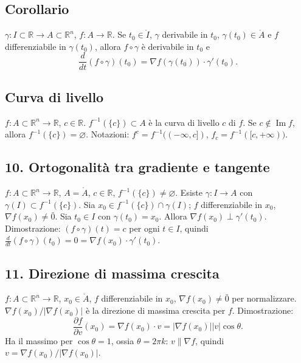 \documentclass[11pt,a4paper]{article}
\newcommand{\R}{\mathbb R}\newcommand{\N}{\mathbb N}\newcommand{\pagina}[1]{\clearpage}
\begin{document}
\subsection*{Corollario}
$\gamma:I\subset\R\to A\subset\R^n$, $f:A\to\R$. Se $t_0\in\mathring I$, $\gamma$ derivabile in $t_0$, $\gamma(t_0)\in\mathring A$ e $f$ differenziabile in $\gamma(t_0)$, allora $f\circ\gamma$ è derivabile in $t_0$ e
\[\frac{d}{dt}(f\circ\gamma)(t_0)=\nabla f(\gamma(t_0))\cdot\gamma'(t_0).\]
\pagina{25}
\subsection*{Curva di livello}
$f:A\subset\R^n\to\R$, $c\in\R$. $f^{-1}(\{c\})\subset A$ è la curva di livello $c$ di $f$. Se $c\notin\operatorname{Im}f$, allora $f^{-1}(\{c\})=\varnothing$.
Notazioni: $f^c=f^{-1}(({-\infty},c])$, $f_c=f^{-1}([c,+\infty))$.
\subsection*{10. Ortogonalità tra gradiente e tangente}
$f:A\subset\R^n\to\R$, $A=\mathring A$, $c\in\R$, $f^{-1}(\{c\})\ne\varnothing$. Esiste $\gamma:I\to A$ con $\gamma(I)\subset f^{-1}(\{c\})$. Sia $x_0\in f^{-1}(\{c\})\cap\gamma(I)$; $f$ differenziabile in $x_0$, $\nabla f(x_0)\ne\bar0$. Sia $t_0\in I$ con $\gamma(t_0)=x_0$. Allora $\nabla f(x_0)\perp\gamma'(t_0)$.
Dimostrazione: $(f\circ\gamma)(t)=c$ per ogni $t\in I$, quindi $\frac d{dt}(f\circ\gamma)(t_0)=0=\nabla f(x_0)\cdot\gamma'(t_0)$.
\begin{center}\end{center}
\subsection*{11. Direzione di massima crescita}
$f:A\subset\R^n\to\R$, $x_0\in\mathring A$, $f$ differenziabile in $x_0$, $\nabla f(x_0)\ne\bar0$ per normalizzare. $\nabla f(x_0)/|\nabla f(x_0)|$ è la direzione di massima crescita per $f$.
\pagina{26}
Dimostrazione:
\[\frac{\partial f}{\partial v}(x_0)=\nabla f(x_0)\cdot v=|\nabla f(x_0)||v|\cos\theta.\]
Ha il massimo per $\cos\theta=1$, ossia $\theta=2\pi k$: $v\parallel\nabla f$, quindi $v=\nabla f(x_0)/|\nabla f(x_0)|$.
\end{document}
